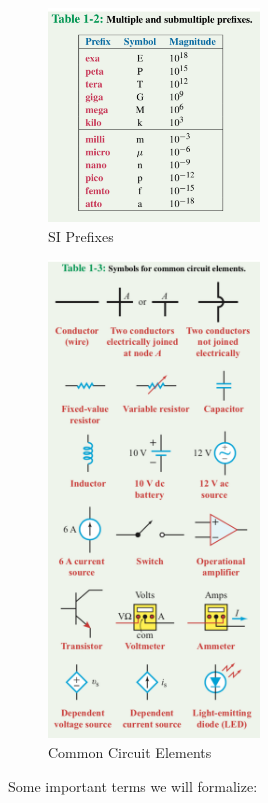 \documentclass{article}
\begin{document}
\begin{figure}[!htbp]
\centering
\includegraphics[width=0.5\textwidth]{table_1-2}
\caption{SI Prefixes}
\label{fig:si_units2}
\end{figure}

\begin{figure}[!htbp]
\centering
\includegraphics[width=0.5\textwidth]{table_1-3}
\caption{Common Circuit Elements}
\label{fig:circuit_elements}
\end{figure}

Some important terms we will formalize:
\end{document}
